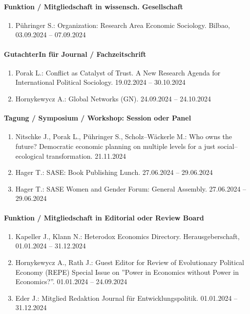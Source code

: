 \paragraph{Funktion / Mitgliedschaft in wissensch. Gesellschaft}
\begin{enumerate}[leftmargin=*, labelsep=0.5cm]
\item Pühringer S.: Organization: Research Area Economic Sociology. Bilbao, 03.09.2024 -- 07.09.2024
\end{enumerate}
\paragraph{GutachterIn für Journal / Fachzeitschrift}
\begin{enumerate}[leftmargin=*, labelsep=0.5cm]
\item Porak L.: Conflict as Catalyst of Trust. A New Research Agenda for International Political Sociology. 19.02.2024 -- 30.10.2024
\item Hornykewycz A.: Global Networks (GN). 24.09.2024 -- 24.10.2024
\end{enumerate}
\paragraph{Tagung / Symposium / Workshop: Session oder Panel}
\begin{enumerate}[leftmargin=*, labelsep=0.5cm]
\item Nitschke J., Porak L., Pühringer S., Scholz--Wäckerle M.: Who owns the future? Democratic economic planning on multiple levels for a just social--ecological transformation. 21.11.2024
\item Hager T.: SASE: Book Publishing Lunch. 27.06.2024 -- 29.06.2024
\item Hager T.: SASE Women and Gender Forum: General Assembly. 27.06.2024 -- 29.06.2024
\end{enumerate}
\paragraph{Funktion / Mitgliedschaft in Editorial oder Review Board}
\begin{enumerate}[leftmargin=*, labelsep=0.5cm]
\item Kapeller J., Klann N.: Heterodox Economics Directory. Herausgeberschaft, 01.01.2024 -- 31.12.2024
\item Hornykewycz A., Rath J.: Guest Editor for Review of Evolutionary Political Economy (REPE) Special Issue on ''Power in Economics without Power in Economics?''. 01.01.2024 -- 24.09.2024
\item Eder J.: Mitglied Redaktion Journal für Entwicklungspolitik. 01.01.2024 -- 31.12.2024
\end{enumerate}
